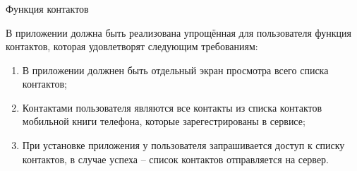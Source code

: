 \subsubsection{} Функция контактов
\label{sec:analysis:research:funcreq:contacts}

В приложении должна быть реализована упрощённая для пользователя функция контактов, которая удовлетворят следующим требованиям:

\begin{enumerate}
	\item В приложении должнен быть отдельный экран просмотра всего списка контактов;
	\item Контактами пользователя являются все контакты из списка контактов мобильной книги телефона, которые зарегестрированы в сервисе;
	\item При установке приложения у пользователя запрашивается доступ к списку контактов, в случае успеха -- список контактов отправляется на сервер.
\end{enumerate}